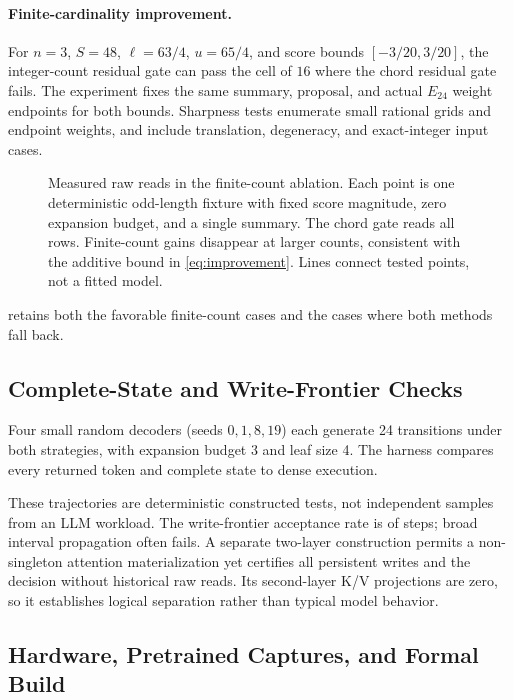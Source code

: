 \documentclass{article}
\theoremstyle{plain}
\theoremstyle{definition}
\theoremstyle{remark}
\newcommand{\E}{E_{24}}
\begin{document}
\paragraph{Finite-cardinality improvement.}
For $n=3$, $S=48$, $\ell=63/4$, $u=65/4$, and score bounds
$[-3/20,3/20]$, the integer-count residual gate can pass the cell of $16$
where the chord residual gate fails. The experiment fixes the same summary,
proposal, and actual $\E$ weight endpoints for both bounds. Sharpness tests
enumerate small rational grids and endpoint weights, and include
translation, degeneracy, and exact-integer input cases.


\begin{figure}[t]
\centering

\caption{Measured raw reads in the finite-count ablation. Each point is one
deterministic odd-length fixture with fixed score magnitude, zero expansion
budget, and a single summary. The chord gate reads all rows. Finite-count
gains disappear at larger counts, consistent with the additive bound in
\cref{eq:improvement}. Lines connect tested points, not a fitted model.}
\label{fig:integer-ablation}
\end{figure}
 retains both the favorable finite-count cases
and the cases where both methods fall back.

\subsection{Complete-State and Write-Frontier Checks}

Four small random decoders (seeds $0,1,8,19$) each generate 24 transitions
under both strategies, with expansion budget 3 and leaf size 4. The harness
compares every returned token and complete state to dense execution.

These trajectories are deterministic constructed tests, not independent
samples from an LLM workload. The write-frontier acceptance rate is
\WriteAccepts{} of \WriteSteps{} steps; broad interval propagation
often fails. A separate two-layer construction permits a non-singleton
attention materialization yet certifies all persistent writes and the
decision without historical raw reads. Its second-layer K/V projections
are zero, so it establishes logical separation rather than typical model
behavior.

\subsection{Hardware, Pretrained Captures, and Formal Build}
\label{sec:measured}



\end{document}
